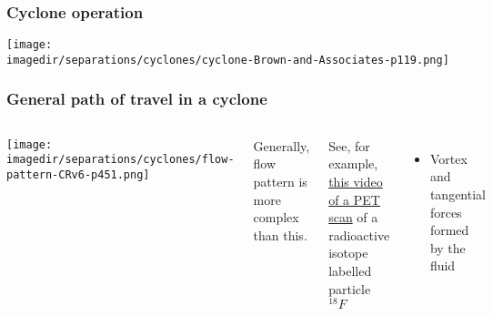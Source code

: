 \begin{frame}\frametitle{Cyclone operation}
	\begin{center}
		\texttt{[image: \\imagedir/separations/cyclones/cyclone-Brown-and-Associates-p119.png]}
	\end{center}
\end{frame}

\begin{frame}\frametitle{General path of travel in a cyclone {}}
	\begin{columns}[c]
			\begin{center}
				\texttt{[image: \\imagedir/separations/cyclones/flow-pattern-CRv6-p451.png]}
			\end{center}
			Generally, flow pattern is more complex than this.

			\vspace{12pt}
			See, for example, \href{http://www.youtube.com/watch?v=CWLARs\_dJO0}{this video of a PET scan} of a radioactive isotope labelled particle $^{18}F$

			\vspace{12pt}
			\begin{itemize}
				\item	Vortex and tangential forces formed by the fluid
			\end{itemize}
	\end{columns}
\end{frame}


